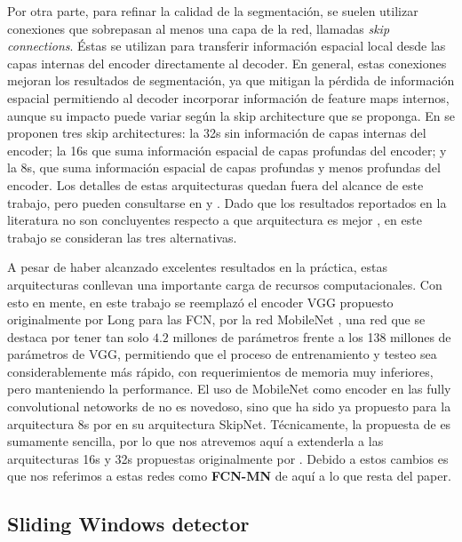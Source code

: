 \documentclass[a4paper,authoryear,review]{elsarticle}
\begin{document}
Por otra parte, para refinar la calidad de la segmentación, se suelen utilizar conexiones que sobrepasan al menos una capa de la red, llamadas \emph{skip connections}. Éstas se utilizan para transferir información espacial local desde las capas internas del encoder directamente al decoder. En general, estas conexiones mejoran los resultados de segmentación, ya que mitigan la pérdida de información espacial permitiendo al decoder incorporar información de feature maps internos, aunque su impacto puede variar según la skip architecture que se proponga. En \citet{long2015fully} se proponen tres skip architectures: la 32s sin información de capas internas del encoder; la 16s que suma información espacial de capas profundas del encoder; y la 8s, que suma información espacial de capas profundas y menos profundas del encoder. Los detalles de estas arquitecturas quedan fuera del alcance de este trabajo, pero pueden consultarse en \citet{long2015fully} y \cite{shelhamer2017fully}. Dado que los resultados reportados en la literatura no son concluyentes respecto a que arquitectura es mejor \cite{long2015fully, shelhamer2017fully}, en este trabajo se consideran las tres alternativas.

A pesar de haber alcanzado excelentes resultados en la práctica,  estas arquitecturas conllevan una importante carga de recursos computacionales. Con esto en mente, en este trabajo se reemplazó el encoder VGG \cite{Simonyan2015VeryDC} propuesto originalmente por Long para las FCN, por la red MobileNet \cite{howard2017mobilenets}, una red que se destaca por tener tan solo $4.2$ millones de parámetros frente a los 138 millones de parámetros de VGG, permitiendo que el proceso de entrenamiento y testeo sea considerablemente más rápido, con requerimientos de memoria muy inferiores, pero manteniendo la performance. El uso de MobileNet como encoder en las fully convolutional netoworks de \citet{long2015fully} no es novedoso, sino que ha sido ya propuesto para la arquitectura 8s por \citet{siam2018rtseg} en su arquitectura SkipNet. Técnicamente, la propuesta de \citet{siam2018rtseg} es sumamente sencilla, por lo que nos atrevemos aquí a extenderla a las arquitecturas 16s y 32s propuestas originalmente por \citep{long2015fully}. Debido a estos cambios es que nos referimos a estas redes como \textbf{FCN-MN} de aquí a lo que resta del paper.


\subsection{Sliding Windows detector}
\label{sec:sw}
\end{document}
